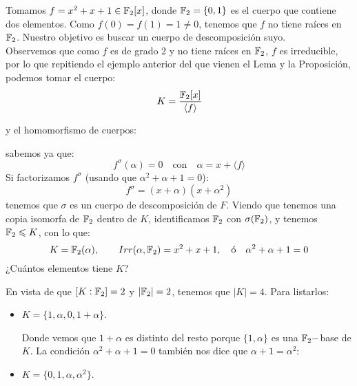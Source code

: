 \begin{ejemplo}
    Tomamos $f = x^2+x+1\in \mathbb{F}_2[x]$, donde $\mathbb{F}_2 = \{0,1\}$ es el cuerpo que contiene dos elementos. Como $f(0) = f(1) = 1 \neq 0$, tenemos que $f$ no tiene raíces en $\mathbb{F}_2$. Nuestro objetivo es buscar un cuerpo de descomposición suyo.\\

    \noindent
    Observemos que como $f$ es de grado 2 y no tiene raíces en $\mathbb{F}_2$, $f$ es irreducible, por lo que repitiendo el ejemplo anterior del que vienen el Lema y la Proposición, podemos tomar el cuerpo:
    \begin{equation*}
        K = \dfrac{\mathbb{F}_2[x]}{\langle f \rangle }
    \end{equation*}

    y el homomorfismo de cuerpos:

    sabemos ya que:
    \begin{equation*}
        f^\sigma(\alpha) = 0 \quad \text{con}\quad  \alpha = x+\langle f \rangle 
    \end{equation*}
    Si factorizamos $f^\sigma$ (usando que $\alpha^2 + \alpha+1=0$):
    \begin{equation*}
        f^\sigma = (x+\alpha)(x+\alpha^2)
    \end{equation*}
    tenemos que $\sigma$ es un cuerpo de descomposición de $F$. Viendo que tenemos una copia isomorfa de $\mathbb{F}_2$ dentro de $K$, identificamos $\mathbb{F}_2$ con $\sigma(\mathbb{F}_2)$, y tenemos $\mathbb{F}_2\leqslant K$, con lo que:
    \begin{equation*}
        K = \mathbb{F}_2(\alpha), \qquad Irr(\alpha,\mathbb{F}_2) = x^2+x+1, \quad \text{ó}\quad \alpha^2 + \alpha+1=0
    \end{equation*}
    ¿Cuántos elementos tiene $K$?

    \noindent
    En vista de que $[K:\mathbb{F}_2] = 2$ y $|\mathbb{F}_2| = 2$, tenemos que $|K| = 4$. Para listarlos:
    \begin{itemize}
        \item $K = \{1,\alpha,0,1+\alpha\}$. 

            Donde vemos que $1+\alpha$ es distinto del resto porque $\{1,\alpha\}$ es una $\mathbb{F}_2-$base de $K$. La condición $\alpha^2 + \alpha + 1 = 0$ también nos dice que $\alpha+1= \alpha^2$:
        \item $K = \{0,1,\alpha,\alpha^2\}$.
    \end{itemize}
\end{ejemplo}

